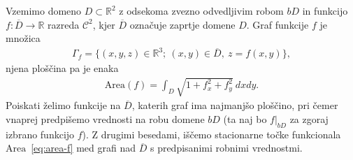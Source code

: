 \documentclass[12pt,a4paper,twoside]{article}
\theoremstyle{definition} %
\theoremstyle{plain} %
\numberwithin{equation}{section}  %
\newcommand{\R}{\mathbb R}
\begin{document}
Vzemimo domeno $D \subset \R^2$ z odsekoma zvezno odvedljivim robom $bD$ in funkcijo $f \colon \overline{D} \to \R$ razreda $\mathcal{C}^2$, kjer $\overline{D}$ označuje zaprtje domene $D$.
Graf funkcije $f$ je množica
\begin{gather}
\Gamma_{f} = \{ (x,y,z) \in \R^3; \ (x,y) \in \overline{D}, \ z=f(x,y) \},
\end{gather}
njena ploščina pa je enaka
\begin{gather} \label{eq:area-f}
\text{Area}(f) = \int_{D} \sqrt{1 + f_{x}^2 + f_{y}^2} \ dxdy.
\end{gather}
Poiskati želimo funkcije na $\overline{D}$, katerih graf ima najmanjšo ploščino, pri čemer vnaprej predpišemo vrednosti na robu domene $bD$ (ta naj bo $f|_{bD}$ za zgoraj izbrano funkcijo $f$). Z drugimi besedami, iščemo stacionarne točke funkcionala $\text{Area}$~\eqref{eq:area-f} med grafi nad $\overline{D}$ s predpisanimi robnimi vrednostmi.
\end{document}

